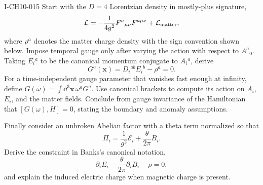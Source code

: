 \begin{exercise}{I-CH10-015}
Start with the $D=4$ Lorentzian density in mostly-plus signature,
\[
  \mathcal L=-\frac1{4g^2}F^a{}_{\mu\nu}F^{a\mu\nu}
  +\mathcal L_{\rm matter},
\]
where $\rho^a$ denotes the matter charge density with the sign convention
shown below.  Impose temporal gauge only after varying the action with respect
to $A^a{}_{0}$.  Taking $E_i{}^a$ to be the canonical momentum conjugate to
$A_i{}^a$, derive
\[
  G^a(\mathbf x)=D_i{}^{ab}E_i{}^b-\rho^a=0.
\]
For a time-independent gauge parameter that vanishes fast enough at infinity,
define $G(\omega)=\int\dd^3\mathbf x\,\omega^aG^a$.  Use canonical brackets to compute
its action on $A_i$, $E_i$, and the matter fields.  Conclude from gauge
invariance of the Hamiltonian that $[G(\omega),H]=0$, stating the boundary and
anomaly assumptions.

Finally consider an unbroken Abelian factor with a theta term normalized so
that
\[
  \Pi_i=\frac1{g^2}\mathcal E_i+\frac{\theta}{2\pi}B_i.
\]
Derive the constraint in Banks's canonical notation,
\[
  \partial_iE_i-\frac{\theta}{2\pi}\partial_iB_i-\rho=0,
\]
and explain the induced electric charge when magnetic charge is present.
\end{exercise}
